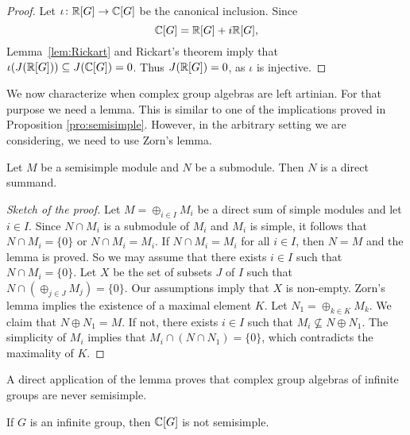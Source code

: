 \begin{proof}
	Let $\iota\colon \mathbb{R}[G]\to\mathbb{C}[G]$ be the canonical inclusion. Since 
	\[
	\mathbb{C}[G]=\mathbb{R}[G]+i\mathbb{R}[G],
	\]
	Lemma~\ref{lem:Rickart} and Rickart's theorem imply that 
	$\iota(J(\mathbb{R}[G]))\subseteq J(\mathbb{C}[G])=0$. Thus $J(\mathbb{R}[G])=0$, as $\iota$ is injective. 
\end{proof}

We now characterize when complex group algebras 
are left artinian. For that purpose
we need a lemma. This is similar to one of the implications proved in Proposition \ref{pro:semisimple}. However,
in the arbitrary setting we are considering, we need to use Zorn's lemma. 

\begin{lemma}
    Let $M$ be a semisimple module and $N$ be a submodule. 
    Then $N$ is a direct summand.
\end{lemma}

\begin{proof}[Sketch of the proof]
    Let $M=\oplus_{i\in I}M_i$ be a direct sum of simple modules  
    and let $i\in I$. 
    Since $N\cap M_i$ is a submodule of $M_i$ and $M_i$ is simple, it follows
    that $N\cap M_i=\{0\}$ or $N\cap M_i=M_i$. If
    $N\cap M_i=M_i$ for all $i\in I$, then $N=M$ and the lemma is proved. So we may assume
    that there exists $i\in I$ such that $N\cap M_i=\{0\}$. Let $X$ be the set
    of subsets $J$ of $I$ such that $N\cap (\oplus_{j\in J}M_j)=\{0\}$. Our assumptions
    imply that $X$ is non-empty. Zorn's lemma implies the existence of 
    a maximal element $K$. Let $N_1=\oplus_{k\in K}M_k$. We claim that
    $N\oplus N_1=M$. If not, there exists $i\in I$ such that
    $M_i\not\subseteq N\oplus N_1$. The simplicity of $M_i$ implies that
    $M_i\cap (N\cap N_1)=\{0\}$, which contradicts the maximality of $K$. 
\end{proof}

A direct application of the lemma proves that
complex group algebras of infinite groups are never semisimple. 

\begin{proposition}
    \label{pro:KGsemisimple}
    If $G$ is an infinite group, then $\mathbb{C}[G]$ is not semisimple. 
\end{proposition}

